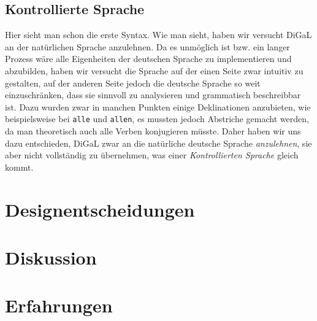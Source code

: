 \documentclass[a4paper, oneside]{book}
\begin{document}
	\section{Kontrollierte Sprache}
	\label{sec:kontrollierte_sprache}
		Hier sieht man schon die erste Syntax. Wie man sieht, haben wir versucht DiGaL an der natürlichen Sprache anzulehnen. Da es unmöglich ist bzw. ein langer Prozess wäre alle Eigenheiten der deutschen Sprache zu implementieren und abzubilden, haben wir versucht die Sprache auf der einen Seite zwar intuitiv zu gestalten, auf der anderen Seite jedoch die deutsche Sprache so weit einzuschränken, dass sie sinnvoll zu analysieren und grammatisch beschreibbar ist. Dazu wurden zwar in manchen Punkten einige Deklinationen anzubieten, wie beispielsweise bei \texttt{alle} und \texttt{allen}, es mussten jedoch Abstriche gemacht werden, da man theoretisch auch alle Verben konjugieren müsste. Daher haben wir uns dazu entschieden, DiGaL zwar an die natürliche deutsche Sprache \emph{anzulehnen}, sie aber nicht vollständig zu übernehmen, was einer \emph{Kontrollierten Sprache} gleich kommt.

	
\chapter{Designentscheidungen} %
\label{cha:designentscheidungen}
	
\chapter{Diskussion}
\label{cha:diskussion}
	
\chapter{Erfahrungen}
\label{cha:erfahrungen}
	
\end{document}
